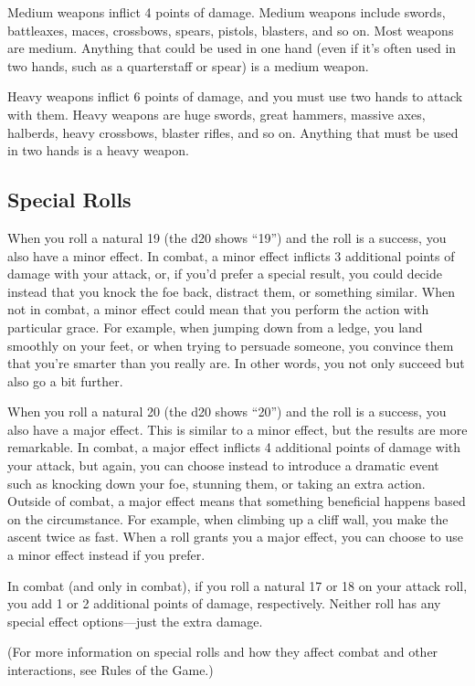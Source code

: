 \begin{multicols}{2}
Medium weapons inflict 4 points of damage. Medium weapons include swords, battleaxes, maces, crossbows, spears, pistols, blasters, and so on. Most weapons are medium. Anything that could be used in one hand (even if it’s often used in two hands, such as a quarterstaff or spear) is a medium weapon.

Heavy weapons inflict 6 points of damage, and you must use two hands to attack with them. Heavy weapons are huge swords, great hammers, massive axes, halberds, heavy crossbows, blaster rifles, and so on. Anything that must be used in two hands is a heavy weapon.

\subsection{Special Rolls}

When you roll a natural 19 (the d20 shows “19”) and the roll is a success, you also have a minor effect. In combat, a minor effect inflicts 3 additional points of damage with your attack, or, if you’d prefer a special result, you could decide instead that you knock the foe back, distract them, or something similar. When not in combat, a minor effect could mean that you perform the action with particular grace. For example, when jumping down from a ledge, you land smoothly on your feet, or when trying to persuade someone, you convince them that you’re smarter than you really are. In other words, you not only succeed but also go a bit further.

When you roll a natural 20 (the d20 shows “20”) and the roll is a success, you also have a major effect. This is similar to a minor effect, but the results are more remarkable. In combat, a major effect inflicts 4 additional points of damage with your attack, but again, you can choose instead to introduce a dramatic event such as knocking down your foe, stunning them, or taking an extra action. Outside of combat, a major effect means that something beneficial happens based on the circumstance. For example, when climbing up a cliff wall, you make the ascent twice as fast. When a roll grants you a major effect, you can choose to use a minor effect instead if you prefer.

In combat (and only in combat), if you roll a natural 17 or 18 on your attack roll, you add 1 or 2 additional points of damage, respectively. Neither roll has any special effect options—just the extra damage.

(For more information on special rolls and how they affect combat and other interactions, see Rules of the Game.)


\end{multicols}
